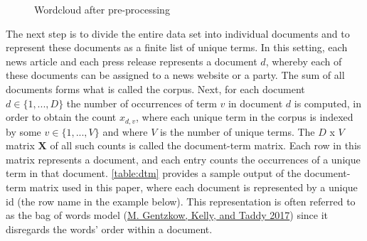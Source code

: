 \documentclass[
  12pt,
]{article}
\begin{document}
\begin{figure}

{\centering {}

}

\caption{Wordcloud after pre-processing \label{fig:wordclouds2}}\label{fig:wordclouds2}
\end{figure}

The next step is to divide the entire data set into individual documents
and to represent these documents as a finite list of unique terms. In
this setting, each news article and each press release represents a
document \(d\), whereby each of these documents can be assigned to a
news website or a party. The sum of all documents forms what is called
the corpus. Next, for each document \(d \in \lbrace 1,...,D \rbrace\)
the number of occurrences of term \(v\) in document \(d\) is computed,
in order to obtain the count \(x_{d,v}\), where each unique term in the
corpus is indexed by some \(v \in \lbrace 1,...,V \rbrace\) and where
\(V\) is the number of unique terms. The \(D\) x \(V\) matrix
\(\boldsymbol{X}\) of all such counts is called the document-term
matrix. Each row in this matrix represents a document, and each entry
counts the occurrences of a unique term in that document.
\autoref{table:dtm} provides a sample output of the document-term matrix
used in this paper, where each document is represented by a unique id
(the row name in the example below). This representation is often
referred to as the bag of words model
(\protect\hyperlink{ref-gentzkow_text_2017}{M. Gentzkow, Kelly, and
Taddy 2017}) since it disregards the words' order within a document.
\end{document}
